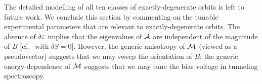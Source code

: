 \documentclass[aps, prb, showpacs, twocolumn, notitlepage, superscriptaddress]{revtex4-1}
\begin{document}
The detailed modelling of all ten classes of exactly-degenerate orbits is left to future work. We conclude this section by commenting on the tunable experimental parameters that are relevant to exactly-degenerate orbits. The absence of $\delta\varepsilon$  implies that the eigenvalues of ${\cal A}$ are independent of the magnitude of $B$ [cf.\  with $\delta S{=}0$]. However, the generic anisotropy of ${\cal M}$ (viewed as a pseudovector) suggests that we may sweep the orientation of $B$; the generic energy-dependence of ${\cal M}$ suggests that we may tune the bias voltage in tunneling spectroscopy.








\end{document}

